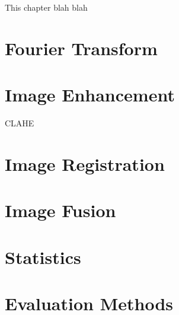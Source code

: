 This chapter blah blah

\section{Fourier Transform}


\section{Image Enhancement}
CLAHE

\section{Image Registration}



\section{Image Fusion}

\section{Statistics}

\section{Evaluation Methods}